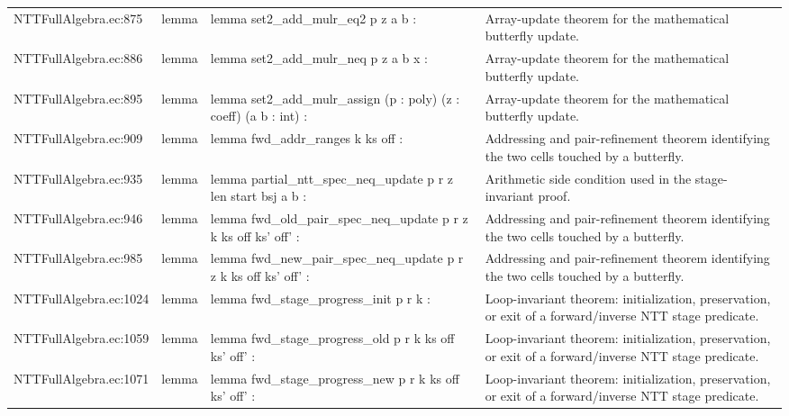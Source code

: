 \documentclass[10pt]{article}
\begin{document}
\begin{longtable}{L{0.11\textwidth}L{0.05\textwidth}L{0.38\textwidth}L{0.42\textwidth}}
NTTFullAlgebra.\allowbreak{}ec:\allowbreak{}875 & lemma & {\ttfamily\scriptsize lemma set2\_add\_mulr\_eq2 p z a b :} & Array-update theorem for the mathematical butterfly update. \\
NTTFullAlgebra.\allowbreak{}ec:\allowbreak{}886 & lemma & {\ttfamily\scriptsize lemma set2\_add\_mulr\_neq p z a b x :} & Array-update theorem for the mathematical butterfly update. \\
NTTFullAlgebra.\allowbreak{}ec:\allowbreak{}895 & lemma & {\ttfamily\scriptsize lemma set2\_add\_mulr\_assign (p : poly) (z : coeff) (a b : int) :} & Array-update theorem for the mathematical butterfly update. \\
NTTFullAlgebra.\allowbreak{}ec:\allowbreak{}909 & lemma & {\ttfamily\scriptsize lemma fwd\_addr\_ranges k ks off :} & Addressing and pair-refinement theorem identifying the two cells touched by a butterfly. \\
NTTFullAlgebra.\allowbreak{}ec:\allowbreak{}935 & lemma & {\ttfamily\scriptsize lemma partial\_ntt\_spec\_neq\_update p r z len start bsj a b :} & Arithmetic side condition used in the stage-invariant proof. \\
NTTFullAlgebra.\allowbreak{}ec:\allowbreak{}946 & lemma & {\ttfamily\scriptsize lemma fwd\_old\_pair\_spec\_neq\_update p r z k ks off ks' off' :} & Addressing and pair-refinement theorem identifying the two cells touched by a butterfly. \\
NTTFullAlgebra.\allowbreak{}ec:\allowbreak{}985 & lemma & {\ttfamily\scriptsize lemma fwd\_new\_pair\_spec\_neq\_update p r z k ks off ks' off' :} & Addressing and pair-refinement theorem identifying the two cells touched by a butterfly. \\
NTTFullAlgebra.\allowbreak{}ec:\allowbreak{}1024 & lemma & {\ttfamily\scriptsize lemma fwd\_stage\_progress\_init p r k :} & Loop-invariant theorem: initialization, preservation, or exit of a forward/inverse NTT stage predicate. \\
NTTFullAlgebra.\allowbreak{}ec:\allowbreak{}1059 & lemma & {\ttfamily\scriptsize lemma fwd\_stage\_progress\_old p r k ks off ks' off' :} & Loop-invariant theorem: initialization, preservation, or exit of a forward/inverse NTT stage predicate. \\
NTTFullAlgebra.\allowbreak{}ec:\allowbreak{}1071 & lemma & {\ttfamily\scriptsize lemma fwd\_stage\_progress\_new p r k ks off ks' off' :} & Loop-invariant theorem: initialization, preservation, or exit of a forward/inverse NTT stage predicate. \\

\end{longtable}
\end{document}
